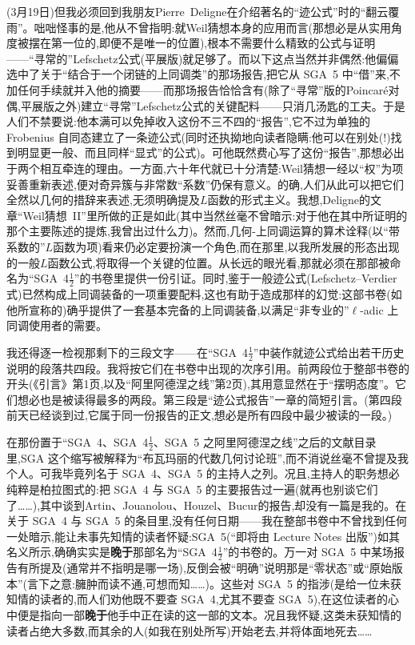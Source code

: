 (3月19日)但我必须回到我朋友Pierre~Deligne在介绍著名的“迹公式”时的“翻云覆雨”。咄咄怪事的是,他从不曾指明:就Weil猜想本身的应用而言(那想必是从实用角度被摆在第一位的,即便不是唯一的位置),根本不需要什么精致的公式与证明——“寻常的”Lefschetz公式(平展版)就足够了。而以下这点当然并非偶然:他偏偏选中了关于“结合于一个闭链的上同调类”的那场报告,把它从 SGA~5 中“借”来,不加任何手续就并入他的摘要——而那场报告恰恰含有(除了“寻常”版的Poincaré对偶,平展版之外)建立“寻常”Lefschetz公式的关键配料——只消几汤匙的工夫。于是人们不禁要说:他本满可以免掉收入这份不三不四的“报告”,它不过为单独的 Frobenius 自同态建立了一条迹公式(同时还执拗地向读者隐瞒:他可以在别处(!)找到明显更一般、而且同样“显式”的公式)。可他既然费心写了这份“报告”,那想必出于两个相互牵连的理由。一方面,六十年代就已十分清楚:Weil猜想一经以“权”为项妥善重新表述,便对奇异簇与非常数“系数”仍保有意义。的确,人们从此可以把它们全然以几何的措辞来表述,无须明确提及$L$\dmark{}函数的形式主义。我想,Deligne的文章“Weil猜想~II”里所做的正是如此(其中当然丝毫不曾暗示:对于他在其中所证明的那个主要陈述的提炼,我曾出过什么力)。然而,几何-上同调运算的算术诠释(以“带系数的”$L$函数为项)看来仍必定要扮演一个角色,而在那里,以我所发展的形态出现的一般$L$函数公式,将取得一个关键的位置。从长远的眼光看,那就必须在那部被命名为“SGA~4$\frac{1}{2}$”的书卷里提供一份引证。同时,鉴于一般迹公式(Lefschetz--Verdier式)已然构成上同调装备的一项重要配料,这也有助于造成那样的幻觉:这部书卷(如他所宣称的)确乎提供了一套基本完备的上同调装备,以满足“非专业的”$\ell$-adic 上同调使用者的需要。

我还得逐一检视那剩下的三段文字——在“SGA~4$\frac{1}{2}$”中装作就迹公式给出若干历史说明的段落共四段。我将按它们在书卷中出现的次序引用。前两段位于整部书卷的开头(《引言》第1页,以及“阿里阿德涅之线”第2页),其用意显然在于“摆明态度”。它们想必也是被读得最多的两段。第三段是“迹公式报告”一章的简短引言。(第四段前天已经谈到过,它属于同一份报告的正文,想必是所有四段中最少被读的一段。)

在那份置于“SGA~4、SGA~4$\frac{1}{2}$、SGA~5 之阿里阿德涅之线”之后的文献目录里,SGA 这个缩写被解释为“布瓦玛丽的代数几何讨论班”,而不消说丝毫不曾提及我个人。可我毕竟列名于 SGA~4、SGA~5 的主持人之列。况且,主持人的职务想必纯粹是柏拉图式的:把 SGA~4 与 SGA~5 的主要报告过一遍(就再也别谈它们了……),其中谈到Artin、Jouanolou、Houzel、Bucur的报告,却没有一篇是我的。在关于 SGA~4 与 SGA~5 的条目里,没有任何日期——我在整部书卷中不曾找到任何一处暗示,能让未事先知情的读者怀疑:SGA~5(“即将由 Lecture Notes 出版”)如其名义所示,确确实实是\textbf{晚于}那部名为“SGA~4$\frac{1}{2}$”的书卷的。万一对 SGA~5 中某场报告有所提及(通常并不指明是哪一场),反倒会被“明确”\dmark{}说明那是“零状态”或“原始版本”(言下之意:臃肿而读不通,可想而知……)。这些对 SGA~5 的指涉(是给一位未获知情的读者的,而人们劝他既不要查 SGA~4,尤其不要查 SGA~5),在这位读者的心中便是指向一部\textbf{晚于}他手中正在读的这一部的文本。况且我怀疑,这类未获知情的读者占绝大多数,而其余的人(如我在别处所写)开始老去,并将体面地死去……

